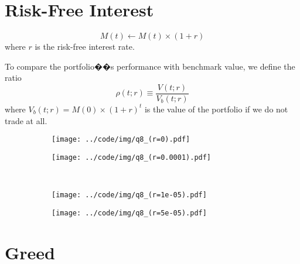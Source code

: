 \documentclass[runningheads]{llncs}
\begin{document}
\section{Risk-Free Interest}\label{sec:8}

\begin{equation}
    M(t) \leftarrow M(t) \times (1+r)
\end{equation}
where $r$ is the risk-free interest rate.

To compare the portfolio��s performance with benchmark value, we define the ratio
\begin{equation}
    \rho(t; r) \equiv \frac{V(t; r)}{V_b(t; r)}
\end{equation}
where $V_b(t; r)=M(0) \times(1+r)^t$ is the value of the portfolio if we do not trade at all.



\begin{figure}[!htbp]
    \begin{subfigure}[t]{0.49\textwidth}
        \centering
        \texttt{[image: ../code/img/q8\_(r=0).pdf]}
    \end{subfigure}
    \begin{subfigure}[t]{0.49\textwidth}
        \centering
        \texttt{[image: ../code/img/q8\_(r=0.0001).pdf]}
    \end{subfigure}
    ~
    \begin{subfigure}[t]{0.49\textwidth}
        \centering
        \texttt{[image: ../code/img/q8\_(r=1e-05).pdf]}
    \end{subfigure}
    \begin{subfigure}[t]{0.49\textwidth}
        \centering
        \texttt{[image: ../code/img/q8\_(r=5e-05).pdf]}
    \end{subfigure}
    \caption{}
    \label{fig:q8}
\end{figure}


\section{Greed}\label{sec:9}
\end{document}
